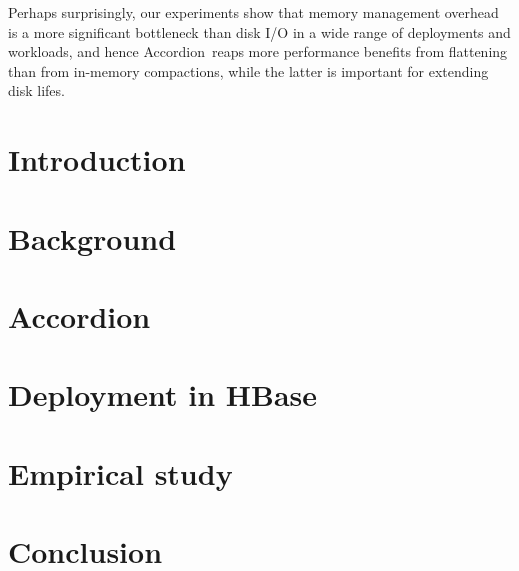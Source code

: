 \documentclass[letterpaper,twocolumn,10pt]{article}
\newcommand{\sys}{Accordion}
\begin{document}
Perhaps surprisingly, our experiments show that memory management overhead is a more significant bottleneck than disk I/O in a
wide range of deployments and workloads, and hence \sys\ reaps more performance benefits from flattening than from in-memory compactions,
while the latter is important for extending disk lifes.


\section{Introduction} \label{sec:intro}
 

\section{Background}\label{sec:bg}
%

\section{\sys} \label{sec:accordion}
 

\section{Deployment in HBase} \label{sec:hbase}

\section{Empirical study} \label{sec:eval}

\section{Conclusion} \label{sec:conclusions}



\newpage




\end{document}
